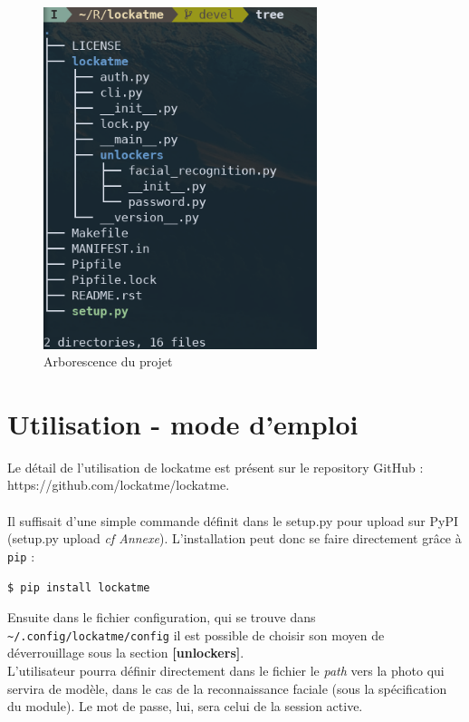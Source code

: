 \documentclass[french]{report}
\begin{document}
\begin{figure}[h]\label{fig:tree}
\begin{center}
  \includegraphics[width=80mm,scale=0.5]{tree}
\end{center}
  \caption{Arborescence du projet}
  \label{fig:tree}
\end{figure}

\section{Utilisation - mode d'emploi}
Le détail de l'utilisation de lockatme est présent sur le repository GitHub :\\
https://github.com/lockatme/lockatme.\\\\
Il suffisait d'une simple commande définit dans le setup.py pour upload sur PyPI (setup.py upload \emph{cf Annexe}).
L'installation peut donc se faire directement grâce à \texttt{pip} :
\begin{lstlisting}[language=bash]
  $ pip install lockatme
\end{lstlisting}

Ensuite dans le fichier configuration, qui se trouve dans \verb|~/.config/lockatme/config|
il est possible de choisir son moyen de déverrouillage sous la section \textbf{[unlockers]}.
\\
L'utilisateur pourra définir directement dans le fichier le \emph{path} vers la photo qui servira
de modèle, dans le cas de la reconnaissance faciale (sous la spécification du module). Le mot de passe, lui, sera celui de
la session active.
\end{document}
